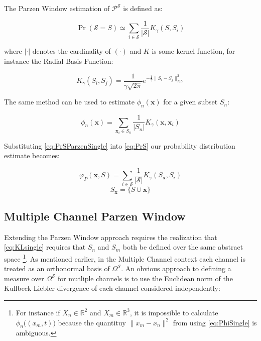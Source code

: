 \documentclass[10pt]{article}
\begin{document}
The Parzen Window estimation of \( \mathcal{P}^\mathcal{S} \) is defined as:

\begin{equation} \label{eq:PrSParzenSingle}
\Pr( \mathcal{S} = S ) \simeq \sum_{i \in \mathcal{S}}  \frac{1}{|\mathcal{S}| } K_\gamma( S, S_i ) 
\end{equation}

where \( | \cdot | \) denotes the cardinality of \( ( \cdot ) \) and \( K \) is some kernel function, for instance the Radial Basis Function:

\begin{equation} \label{eq:KRBFparzen}
K_\gamma( S_i, S_j ) =  \frac{1}{\gamma \sqrt{2\pi} } e^{-\frac{1}{\gamma} \|S_i - S_j \|_{KL}^2}
\end{equation}

The same method can be used to estimate \( \phi_n(\mathbf{x}) \) for a given subset \( S_n \):

\begin{equation} \label{eq:PhiSingle}
\phi_n( \mathbf{x} ) = \sum_{\mathbf{x}_i \in S_n} \frac{1}{|S_n|}  K_\gamma (\mathbf{x}, \mathbf{x}_i ) 
\end{equation}

Substituting \ref{eq:PrSParzenSingle} into \ref{eq:PrS} our probability distribution estimate becomes:

\begin{equation} \label{eq:VarphiParzenSingle}
\varphi_P(\mathbf{x}, S) = \sum_{i \in \mathcal{S}} \frac{1}{|\mathcal{S}|} K_\gamma ( S_{\mathbf{x}}, S_i )
\end{equation}
\[ S_{\mathbf{x}} = \{ S \cup \mathbf{x} \}\]


\subsection{ Multiple Channel Parzen Window}

Extending the Parzen Window approach requires the realization that \ref{eq:KLsingle} requires that \( S_n \) and \( S_m \) both be defined over the same abstract space \footnote{ For instance if \( X_n \in \mathbb{R}^2 \) and \( X_m \in \mathbb{R}^3 \), it is impossible to calculate \( \phi_n\big( (x_m,t) \big) \) because the quantituy \( \| x_m - x_n \|^2 \) from using \ref{eq:PhiSingle} is ambiguous.}.  As mentioned earlier, in the Multiple Channel context each channel is treated as an orthonormal basis of \( \Omega^\mathcal{S} \).  An obvious approach to defining a measure over \( \Omega^\mathcal{S} \) for mutliple channels is to use the Euclidean norm of the Kullbeck Liebler divergence of each channel considered independently:
\end{document}
